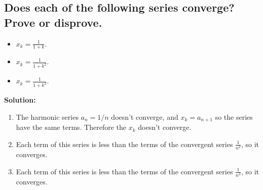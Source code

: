 \documentclass{article}
\newcommand{\exercise}[1]{\subsection{\normalfont #1}}
\newcommand{\solution}{\indent\indent \textbf{Solution: }}
\begin{document}
\exercise{Does each of the following series converge? Prove or disprove.}
\begin{itemize}
\item $x_k = \frac{1}{1+k}$. 
\item $x_k = \frac{1}{1+k^2}$.
\item $x_k = \frac{1} {1+k^3}$.
\end{itemize}
\solution 
\begin{enumerate}
\item The harmonic series $a_n = 1/n$ doesn't converge, and $x_k = a_{n+1}$ so the series have the same terms. Therefore the $x_k$ doesn't converge.  
\item Each term of this series is less than the terms of the convergent series $\frac{1}{n^2}$, so it converges.
\item Each term of this series is less than the terms of the convergent series $\frac{1}{n^3}$, so it converges.
\end{enumerate}

\newpage
\end{document}
